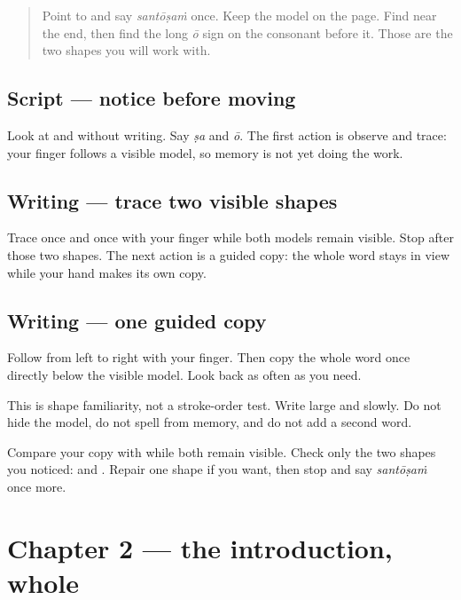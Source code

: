 \label{lesson:ML-W02-santosham-guided-copy}



\begin{quote}
Point to \textbf{} and say \emph{santōṣaṁ} once. Keep the model on the page. Find \textbf{} near the end, then find the long \emph{ō} sign \textbf{} on the consonant before it. Those are the two shapes you will work with.
\end{quote}

\subsection*{Script — notice before moving}
Look at \textbf{} and \textbf{} without writing. Say \emph{ṣa} and \emph{ō}. The first action is observe and trace: your finger follows a visible model, so memory is not yet doing the work.

\subsection*{Writing — trace two visible shapes}
Trace \textbf{} once and \textbf{} once with your finger while both models remain visible. Stop after those two shapes. The next action is a guided copy: the whole word stays in view while your hand makes its own copy.

\subsection*{Writing — one guided copy}
Follow \textbf{} from left to right with your finger. Then copy the whole word once directly below the visible model. Look back as often as you need.

This is shape familiarity, not a stroke-order test. Write large and slowly. Do not hide the model, do not spell from memory, and do not add a second word.

\begin{tcolorbox}[breakable,colback=teal!4,colframe=teal!35!black,title={Before you move on}]
Compare your copy with \textbf{} while both remain visible. Check only the two shapes you noticed: \textbf{} and \textbf{}. Repair one shape if you want, then stop and say \emph{santōṣaṁ} once more.
\end{tcolorbox}
\section[Practice]{Chapter 2 — the introduction, whole}

